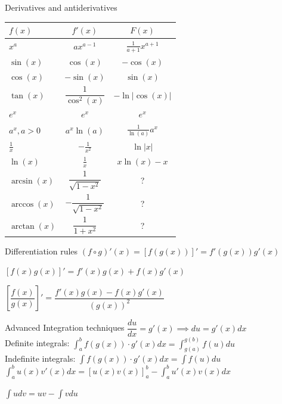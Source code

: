 \begin{topic}{Derivatives and antiderivatives}
	\begin{tabular}{lcc}
		$f(x)$ & $f'(x)$ & $F(x)$ \\
		\midrule
		$x^a$		& $ax^{a-1}$	& $\frac{1}{a+1}x^{a+1}$ \\
		$\sin(x)$	& $\cos(x)$		& $-\cos(x)$ \\
		$\cos(x)$	& $-\sin(x)$	& $\sin(x)$ \\
		$\tan(x)$	& $\dfrac{1}{\cos^2(x)}$	& $-\ln|\cos(x)|$ \\
		$e^x$		& $e^x$			& $e^x$ \\
		$a^x, a>0$		& $a^x\ln(a)$	& $\frac{1}{\ln(a)}a^x$ \\
		$\frac{1}{x}$& $-\frac{1}{x^2}$ & $\ln|x|$\\
		$\ln(x)$	& $\frac{1}{x}$	& $x\ln(x) - x$ \\
		$\arcsin(x)$ & $\dfrac{1}{\sqrt{1-x^2}}$ & ? \\
		$\arccos(x)$ & $-\dfrac{1}{\sqrt{1-x^2}}$ & ? \\
		$\arctan(x)$ & $\dfrac{1}{1+x^2}$ & ? \\

	\end{tabular}
\end{topic}

\begin{topic}{Differentiation rules}
	 $(f \circ g)'(x) = [f(g(x))]' = f'(g(x))g'(x)$ 

	$[f(x)g(x)]' = f'(x)g(x) + f(x)g'(x) $ 

	$\left[\dfrac{f(x)}{g(x)}\right]' = \dfrac{f'(x)g(x) - f(x)g'(x)}{(g(x))^2} $ 

	\endblock
\end{topic}

\begin{topic}{Advanced Integration techniques}
	$\dfrac{du}{dx} = g'(x) \implies du = g'(x)dx $ \\
	Definite integrals: $\displaystyle \int_a^b f(g(x))\cdot g'(x)dx = \int_{g(a)}^{g(b)}f(u)du $ \\ 
	Indefinite integrals: $\displaystyle \int f(g(x))\cdot g'(x)dx = \int f(u)du $ \\

		$\displaystyle \int_a^b u(x)v'(x)dx = \left[ u(x)v(x) \right]_a^b - \int_a^b u'(x)v(x)dx $

	$\displaystyle \int udv = uv - \int vdu$

	\endblock
	
\end{topic}

